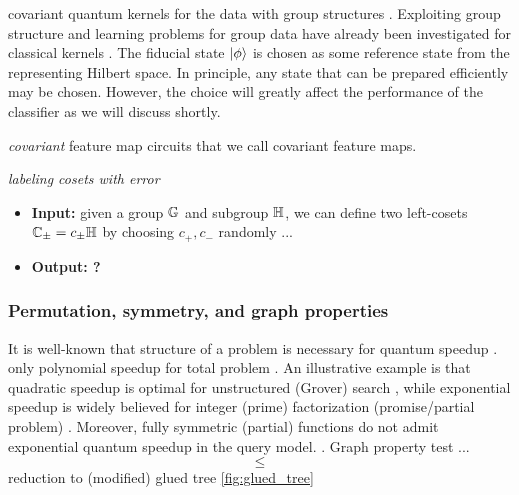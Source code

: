 covariant quantum kernels for the data with group structures
\cite{glickCovariantQuantumKernels2021}.
Exploiting group structure and learning problems for group data have already been investigated for classical kernels \cite{kondorGroupTheoreticalMethods2008}.
The fiducial state $\ket{\phi}$ is chosen as some reference state from the representing Hilbert space. 
In principle, any state that can be prepared efficiently may be chosen. 
However, the choice will greatly affect the performance of the classifier as we will discuss shortly.
\begin{definition}[Covariant]\label{def:covariant}
	\emph{covariant}
	feature map circuits that we call covariant feature maps. 
\end{definition}
\begin{problem}
	\emph{labeling cosets with error}
	\begin{itemize}
		\item 
		\textbf{Input:} given a group $\mathbb{G}$ and subgroup $\mathbb{H}$,
		we can define two left-cosets $\mathbb{C}_{\pm}=c_{\pm}\mathbb{H}$ by choosing $c_+,c_-$ randomly ...
		\item 
		\textbf{Output: ?} 
	\end{itemize}
\end{problem}

\subsubsection{Permutation, symmetry, and graph properties}
It is well-known that structure of a problem is necessary for quantum speedup \cite{aaronsonNeedStructureQuantum2014}.
only polynomial speedup for total problem \cite{bealsQuantumLowerBounds2001} \cite{aaronsonQuantumImplicationsHuang2020}.
An illustrative example is that quadratic speedup is optimal for unstructured (Grover) search \cite{groverQuantumMechanicsHelps1997}, while exponential speedup is widely believed for integer (prime) factorization (promise/partial problem) \cite{shorPolynomialTimeAlgorithmsPrime1997}.
Moreover, fully symmetric (partial) functions do not admit exponential quantum speedup in the query model.
\cite{ben-davidSymmetriesGraphProperties2020}.
Graph property test ...
\begin{equation}
	\le 
\end{equation}
reduction to (modified) glued tree \cref{fig:glued_tree}

